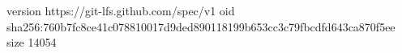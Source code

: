 version https://git-lfs.github.com/spec/v1
oid sha256:760b7fc8ce41c078810017d9ded890118199b653cc3c79fbcdfd643ca870f5ee
size 14054
